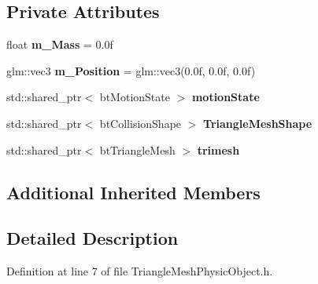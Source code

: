\subsection*{Private Attributes}
\begin{DoxyCompactItemize}
\item 
float {\bfseries m\+\_\+\+Mass} = 0.\+0f\hypertarget{class_physics_1_1_triangle_mesh_physic_object_aac500c8be3e6418cec3fc058ade432e4}{}\label{class_physics_1_1_triangle_mesh_physic_object_aac500c8be3e6418cec3fc058ade432e4}

\item 
glm\+::vec3 {\bfseries m\+\_\+\+Position} = glm\+::vec3(0.\+0f, 0.\+0f, 0.\+0f)\hypertarget{class_physics_1_1_triangle_mesh_physic_object_aec73e165c03e2ab4499337bd4b0fe4a9}{}\label{class_physics_1_1_triangle_mesh_physic_object_aec73e165c03e2ab4499337bd4b0fe4a9}

\item 
std\+::shared\+\_\+ptr$<$ bt\+Motion\+State $>$ {\bfseries motion\+State}\hypertarget{class_physics_1_1_triangle_mesh_physic_object_abac8fd064531872e925cdd081db7ea8c}{}\label{class_physics_1_1_triangle_mesh_physic_object_abac8fd064531872e925cdd081db7ea8c}

\item 
std\+::shared\+\_\+ptr$<$ bt\+Collision\+Shape $>$ {\bfseries Triangle\+Mesh\+Shape}\hypertarget{class_physics_1_1_triangle_mesh_physic_object_aa5a588eec6fcbccb035759226a1b91c2}{}\label{class_physics_1_1_triangle_mesh_physic_object_aa5a588eec6fcbccb035759226a1b91c2}

\item 
std\+::shared\+\_\+ptr$<$ bt\+Triangle\+Mesh $>$ {\bfseries trimesh}\hypertarget{class_physics_1_1_triangle_mesh_physic_object_ac7a9eb987892d4c80d497e3036d2647c}{}\label{class_physics_1_1_triangle_mesh_physic_object_ac7a9eb987892d4c80d497e3036d2647c}

\end{DoxyCompactItemize}
\subsection*{Additional Inherited Members}


\subsection{Detailed Description}


Definition at line 7 of file Triangle\+Mesh\+Physic\+Object.\+h.

